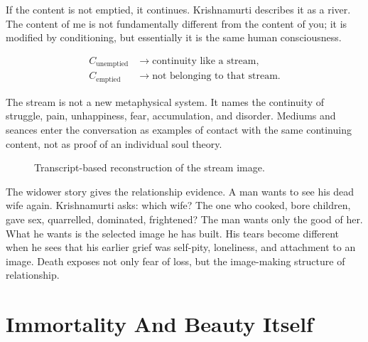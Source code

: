 \documentclass[11pt,oneside]{book}
\begin{document}
If the content is not emptied, it continues. Krishnamurti describes it as a river. The content of me is not fundamentally different from the content of you; it is modified by conditioning, but essentially it is the same human consciousness.

\begin{align}
C_{\text{unemptied}}
&\longrightarrow
\text{continuity like a stream},\\
C_{\text{emptied}}
&\longrightarrow
\text{not belonging to that stream}.
\end{align}

The stream is not a new metaphysical system. It names the continuity of struggle, pain, unhappiness, fear, accumulation, and disorder. Mediums and seances enter the conversation as examples of contact with the same continuing content, not as proof of an individual soul theory.

\begin{figure}
\centering
{}

Transcript-based reconstruction of the stream image.
\end{figure}

The widower story gives the relationship evidence. A man wants to see his dead wife again. Krishnamurti asks: which wife? The one who cooked, bore children, gave sex, quarrelled, dominated, frightened? The man wants only the good of her. What he wants is the selected image he has built. His tears become different when he sees that his earlier grief was self-pity, loneliness, and attachment to an image. Death exposes not only fear of loss, but the image-making structure of relationship.

\section{Immortality And Beauty Itself}
\end{document}
